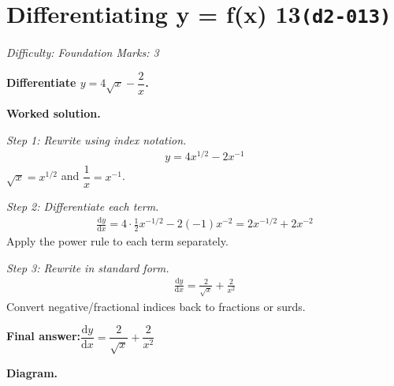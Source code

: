 \documentclass[11pt]{article}
\newcommand{\question}[1]{\par\medskip\noindent\textbf{#1}\par}
\begin{document}
\section*{Differentiating y = f(x) 13\quad\small\texttt{(d2-013)}}
\textit{Difficulty: Foundation \quad\textbar\quad Marks: 3}

\question{Differentiate \( y = 4\sqrt{x} - \dfrac{2}{x} \).}

\textbf{Worked solution.}

\textit{Step 1: Rewrite using index notation.}
\[\begin{gathered}
y = 4x^{1/2} - 2x^{-1}
\end{gathered}\]
\( \sqrt{x} = x^{1/2} \) and \( \dfrac{1}{x} = x^{-1} \).

\textit{Step 2: Differentiate each term.}
\[\begin{gathered}
\frac{\mathrm{d}y}{\mathrm{d}x} = 4 \cdot \tfrac{1}{2} x^{-1/2} - 2(-1)x^{-2} = 2x^{-1/2} + 2x^{-2}
\end{gathered}\]
Apply the power rule to each term separately.

\textit{Step 3: Rewrite in standard form.}
\[\begin{gathered}
\frac{\mathrm{d}y}{\mathrm{d}x} = \frac{2}{\sqrt{x}} + \frac{2}{x^2}
\end{gathered}\]
Convert negative/fractional indices back to fractions or surds.

\begin{answerbox}
\textbf{Final answer:}\quad \(\displaystyle  \dfrac{\mathrm{d}y}{\mathrm{d}x} = \dfrac{2}{\sqrt{x}} + \dfrac{2}{x^2} \)
\end{answerbox}
\textbf{Diagram.}
\end{document}

